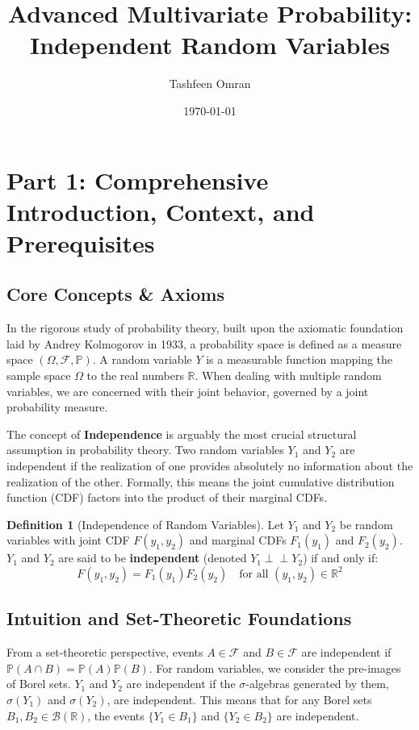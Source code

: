 \documentclass[11pt, a4paper]{article}
\title{\textbf{Advanced Multivariate Probability: \\ Independent Random Variables}}
\author{Tashfeen Omran}
\date{\today}
\theoremstyle{definition}
\newtheorem{definition}{Definition}[section]
\theoremstyle{remark}
\newcommand{\R}{\mathbb{R}}
\newcommand{\Prob}{\mathbb{P}}
\newcommand{\F}{\mathcal{F}}
\newcommand{\indep}{\perp\!\!\!\perp}
\begin{document}
\maketitle
\tableofcontents
\newpage

\section{Part 1: Comprehensive Introduction, Context, and Prerequisites}

\subsection{Core Concepts \& Axioms}
In the rigorous study of probability theory, built upon the axiomatic foundation laid by Andrey Kolmogorov in 1933, a probability space is defined as a measure space $(\Omega, \F, \Prob)$. A random variable $Y$ is a measurable function mapping the sample space $\Omega$ to the real numbers $\R$. When dealing with multiple random variables, we are concerned with their joint behavior, governed by a joint probability measure.

The concept of \textbf{Independence} is arguably the most crucial structural assumption in probability theory. Two random variables $Y_1$ and $Y_2$ are independent if the realization of one provides absolutely no information about the realization of the other. Formally, this means the joint cumulative distribution function (CDF) factors into the product of their marginal CDFs.

\begin{definition}[Independence of Random Variables]
Let $Y_1$ and $Y_2$ be random variables with joint CDF $F(y_1, y_2)$ and marginal CDFs $F_1(y_1)$ and $F_2(y_2)$. $Y_1$ and $Y_2$ are said to be \textbf{independent} (denoted $Y_1 \indep Y_2$) if and only if:
\[ F(y_1, y_2) = F_1(y_1)F_2(y_2) \quad \text{for all } (y_1, y_2) \in \R^2 \]
\end{definition}

\subsection{Intuition and Set-Theoretic Foundations}
From a set-theoretic perspective, events $A \in \F$ and $B \in \F$ are independent if $\Prob(A \cap B) = \Prob(A)\Prob(B)$. For random variables, we consider the pre-images of Borel sets. $Y_1$ and $Y_2$ are independent if the $\sigma$-algebras generated by them, $\sigma(Y_1)$ and $\sigma(Y_2)$, are independent. This means that for any Borel sets $B_1, B_2 \in \mathcal{B}(\R)$, the events $\{Y_1 \in B_1\}$ and $\{Y_2 \in B_2\}$ are independent. 
\end{document}
